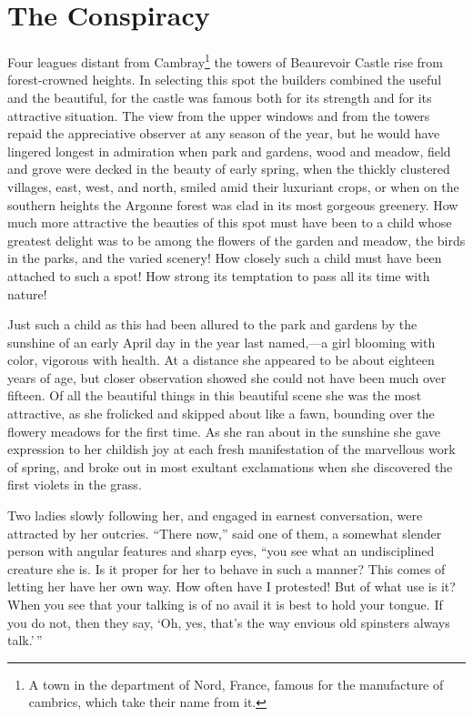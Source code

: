 \chapter{The Conspiracy}

\drop Four leagues distant from Cambray\footnote{A town in the
  department of Nord, France, famous for the manufacture of cambrics,
  which take their name from it.} the towers of Beaurevoir Castle rise
from forest-crowned heights. In selecting this spot the builders
combined the useful and the beautiful, for the castle was famous both
for its strength and for its attractive situation. The view from the
upper windows and from the towers repaid the appreciative observer at
any season of the year, but he would have lingered longest in admiration
when park and gardens, wood and meadow, field and grove were decked in
the beauty of early spring, when the thickly clustered villages, east,
west, and north, smiled amid their luxuriant crops, or when on the
southern heights the Argonne forest was clad in its most gorgeous
greenery. How much more attractive the beauties of this spot must have
been to a child whose greatest delight was to be among the flowers of
the garden and meadow, the birds in the parks, and the varied scenery!
How closely such a child must have been attached to such a spot! How
strong its temptation to pass all its time with nature!

Just such a child as this had been allured to the park and gardens by
the sunshine of an early April day in the year last named,---a girl
blooming with color, vigorous with health. At a distance she appeared to
be about eighteen years of age, but closer observation showed she could
not have been much over fifteen. Of all the beautiful things in this
beautiful scene she was the most attractive, as she frolicked and
skipped about like a fawn, bounding over the flowery meadows for the
first time. As she ran about in the sunshine she gave expression to her
childish joy at each fresh manifestation of the marvellous work of
spring, and broke out in most exultant exclamations when she discovered
the first violets in the grass.

Two ladies slowly following her, and engaged in earnest conversation,
were attracted by her outcries. ``There now,'' said one of them, a
somewhat slender person with angular features and sharp eyes, ``you see
what an undisciplined creature she is. Is it proper for her to behave in
such a manner? This comes of letting her have her own way. How often
have I protested! But of what use is it? When you see that your talking
is of no avail it is best to hold your tongue. If you do not, then they
say, `Oh, yes, that's the way envious old spinsters always talk.'\,''

